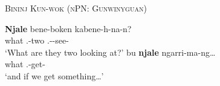 \documentclass[12pt,egregdoesnotlikesansseriftitles]{scrartcl}
\begin{document}

\begin{exe}
  \ex\label{ex:bkwidf} \textsc{Bininj Kun-wok (nPN: Gunwinyguan)}\hfill {}
  \begin{xlist}
    \ex\gll \textbf{Njale} bene-boken kabene-h-na-n?\\
    what \Third.\Ua-two \Third.\Ua-\Imm-see-\Np\\
    `What are they two looking at?' \label{ex:bkwidf1} %
    \ex\gll bu \textbf{njale} ngarri-ma-ng\ldots\\
    \Sub{} what \First.\Aug-get-\Np\\
    `and if we get something\ldots' \label{ex:bkwidf2}%
  \end{xlist}
\end{exe}
\end{document}
